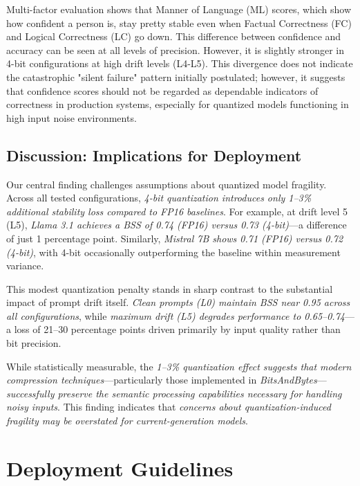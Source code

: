 \documentclass[conference]{IEEEtran}
\begin{document}
{Multi-factor evaluation shows that Manner of Language (ML) scores, which show how confident a person is, stay pretty stable even when Factual Correctness (FC) and Logical Correctness (LC) go down. This difference between confidence and accuracy can be seen at all levels of precision. However, it is slightly stronger in 4-bit configurations at high drift levels (L4-L5).
This divergence does not indicate the catastrophic "silent failure" pattern initially postulated; however, it suggests that confidence scores should not be regarded as dependable indicators of correctness in production systems, especially for quantized models functioning in high input noise environments.


\subsection{Discussion: Implications for Deployment}

Our central finding challenges assumptions about quantized model fragility. Across all tested configurations, \textit{4-bit quantization introduces only 1--3\% additional stability loss compared to FP16 baselines}. For example, at drift level 5 (L5), \textit{Llama 3.1 achieves a BSS of 0.74 (FP16) versus 0.73 (4-bit)}---a difference of just 1 percentage point. Similarly, \textit{Mistral 7B shows 0.71 (FP16) versus 0.72 (4-bit)}, with 4-bit occasionally outperforming the baseline within measurement variance.

This modest quantization penalty stands in sharp contrast to the substantial impact of prompt drift itself. \textit{Clean prompts (L0) maintain BSS near 0.95 across all configurations}, while \textit{maximum drift (L5) degrades performance to 0.65--0.74}---a loss of 21--30 percentage points driven primarily by input quality rather than bit precision.

While statistically measurable, the \textit{1--3\% quantization effect suggests that modern compression techniques}---particularly those implemented in \textit{BitsAndBytes}---\textit{successfully preserve the semantic processing capabilities necessary for handling noisy inputs}. This finding indicates that \textit{concerns about quantization-induced fragility may be overstated for current-generation models}.



\section{Deployment Guidelines}

}
\end{document}
